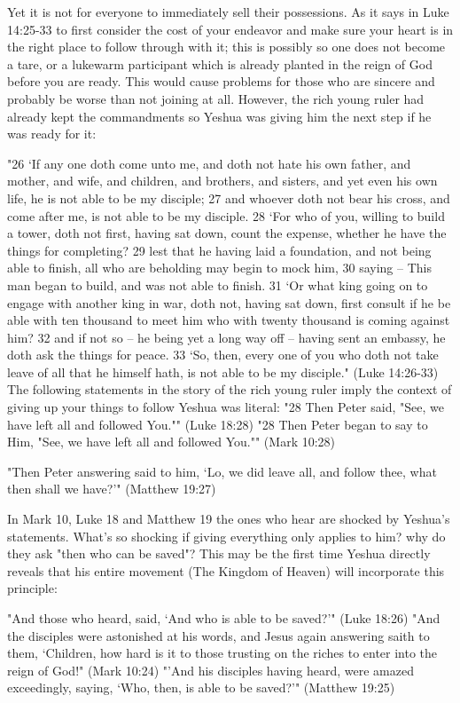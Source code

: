 \documentclass[11pt]{article}
\begin{document}
Yet it is not for everyone to immediately sell their possessions. As it says in Luke 14:25-33 to first consider the cost of your endeavor and make sure your heart is in the right place to follow through with it; this is possibly so one does not become a tare, or a lukewarm participant which is already planted in the reign of God before you are ready. This would cause problems for those who are sincere and probably be worse than not joining at all. However, the rich young ruler had already kept the commandments so Yeshua was giving him the next step if he was ready for it:

"26 `If any one doth come unto me, and doth not hate his own father, and mother, and wife, and children, and brothers, and sisters, and yet even his own life, he is not able to be my disciple;
27 and whoever doth not bear his cross, and come after me, is not able to be my disciple.
28 `For who of you, willing to build a tower, doth not first, having sat down, count the expense, whether he have the things for completing?
29 lest that he having laid a foundation, and not being able to finish, all who are beholding may begin to mock him,
30 saying -- This man began to build, and was not able to finish.
31 `Or what king going on to engage with another king in war, doth not, having sat down, first consult if he be able with ten thousand to meet him who with twenty thousand is coming against him?
32 and if not so -- he being yet a long way off -- having sent an embassy, he doth ask the things for peace.
33 `So, then, every one of you who doth not take leave of all that he himself hath, is not able to be my disciple." (Luke 14:26-33)
The following statements in the story of the rich young ruler imply the context of giving up your things to follow Yeshua was literal:
"28 Then Peter said, "See, we have left all and followed You."" (Luke 18:28)
"28 Then Peter began to say to Him, "See, we have left all and followed You."" (Mark 10:28)

"Then Peter answering said to him, `Lo, we did leave all, and follow thee, what then shall we have?'" (Matthew 19:27)

In Mark 10, Luke 18 and Matthew 19 the ones who hear are shocked by Yeshua's statements. What's so shocking if giving everything only applies to him? why do they ask "then who can be saved"? This may be the first time Yeshua directly reveals that his entire movement (The Kingdom of Heaven) will incorporate this principle:

"And those who heard, said, `And who is able to be saved?'" (Luke 18:26)
"And the disciples were astonished at his words, and Jesus again answering saith to them, `Children, how hard is it to those trusting on the riches to enter into the reign of God!" (Mark 10:24) 
"'And his disciples having heard, were amazed exceedingly, saying, `Who, then, is able to be saved?'" (Matthew 19:25)
\end{document}
